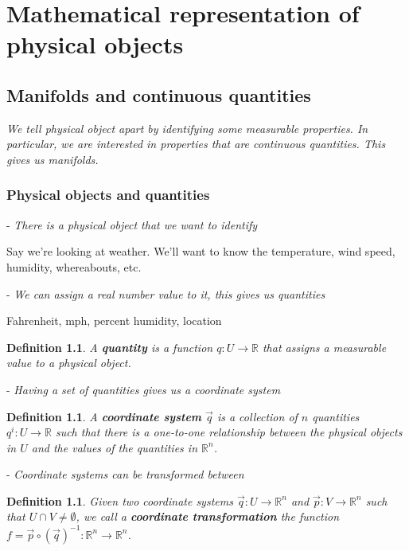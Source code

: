 \documentclass{book}
\newtheorem{defn}[equation]{Definition}
\begin{document}
\tableofcontents

\chapter{Mathematical representation of physical objects}



\section{Manifolds and continuous quantities}
\emph{We tell physical object apart by identifying some measurable properties. In particular, we are interested in properties that are continuous quantities. This gives us manifolds.}

\subsection{Physical objects and quantities}

- \emph{There is a physical object that we want to identify}

Say we're looking at weather. We'll want to know the temperature, wind speed, humidity, whereabouts, etc.

- \emph{We can assign a real number value to it, this gives us quantities}

Fahrenheit, mph, percent humidity, location 




\begin{defn}
	A \textbf{quantity} is a function $q : U \to \mathbb{R}$ that assigns a measurable value to a physical object.
\end{defn}


- \emph{Having a set of quantities gives us a coordinate system}

\begin{defn}
	A \textbf{coordinate system} $\vec{q}$ is a collection of $n$ quantities $q^i : U \to \mathbb{R}$ such that there is a one-to-one relationship between the physical objects in $U$ and the values of the quantities in $\mathbb{R}^n$.
\end{defn}


- \emph{Coordinate systems can be transformed between}

\begin{defn}
	Given two coordinate systems  $\vec{q} : U \to \mathbb{R}^n$ and $\vec{p} : V \to \mathbb{R}^n$ such that $U \cap V \neq \emptyset$, we call a \textbf{coordinate transformation} the function $f = \vec{p} \circ (\vec{q})^{-1} : \mathbb{R}^n \to \mathbb{R}^n$.
\end{defn}
\end{document}
